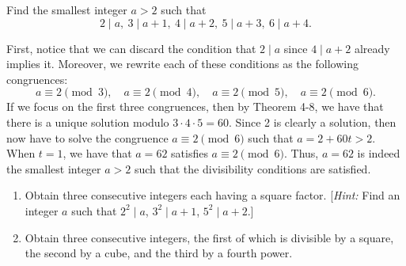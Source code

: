 \begin{exercise}
    Find the smallest integer $a > 2$ such that 
    $$2 \mid a, \ 3 \mid a + 1, \ 4 \mid a + 2, \ 5 \mid a+ 3, \ 6 \mid a + 4.$$
\end{exercise}

\begin{solution}
    First, notice that we can discard the condition that $2 \mid a$ since $4 \mid a + 2$ already implies it. Moreover, we rewrite each of these conditions as the following congruences:
    $$a \equiv 2 \pmod{3}, \quad a \equiv 2 \pmod{4}, \quad a \equiv 2 \pmod{5}, \quad a \equiv 2 \pmod{6}.$$
    If we focus on the first three congruences, then by Theorem 4-8, we have that there is a unique solution modulo $3 \cdot 4 \cdot 5 = 60$. Since 2 is clearly a solution, then now have to solve the congruence $a \equiv 2 \pmod 6$ such that $a = 2 + 60t > 2$. When $t = 1$, we have that $a = 62$ satisfies $a \equiv 2 \pmod 6$. Thus, $a = 62$ is indeed the smallest integer $a > 2$ such that the divisibility conditions are satisfied. \\
\end{solution}

\begin{exercise}
    \begin{enumerate}
        \item Obtain three consecutive integers each having a square factor. [\textit{Hint:}  Find an integer $a$ such that $2^2 \mid a$, $3^2 \mid a + 1$, $5^2 \mid a + 2$.]
        \item Obtain three consecutive integers, the first of which is divisible by a square, the second by a cube, and the third by a fourth power.
    \end{enumerate}
\end{exercise}

